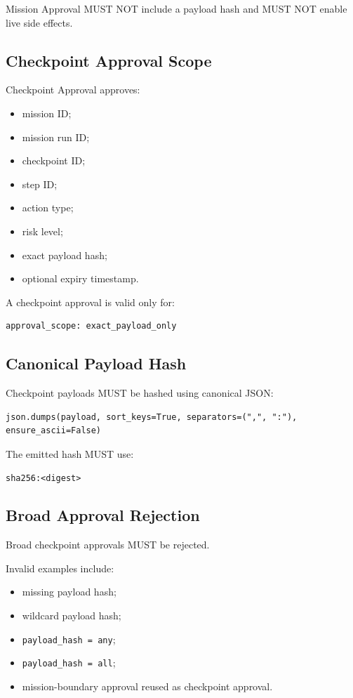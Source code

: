 Mission Approval MUST NOT include a payload hash and MUST NOT enable live side effects.

\subsection{Checkpoint Approval Scope}

Checkpoint Approval approves:

\begin{itemize}
  \item mission ID;
  \item mission run ID;
  \item checkpoint ID;
  \item step ID;
  \item action type;
  \item risk level;
  \item exact payload hash;
  \item optional expiry timestamp.
\end{itemize}

A checkpoint approval is valid only for:

\begin{verbatim}
approval_scope: exact_payload_only
\end{verbatim}

\subsection{Canonical Payload Hash}

Checkpoint payloads MUST be hashed using canonical JSON:

\begin{verbatim}
json.dumps(payload, sort_keys=True, separators=(",", ":"), ensure_ascii=False)
\end{verbatim}

The emitted hash MUST use:

\begin{verbatim}
sha256:<digest>
\end{verbatim}

\subsection{Broad Approval Rejection}

Broad checkpoint approvals MUST be rejected.

Invalid examples include:

\begin{itemize}
  \item missing payload hash;
  \item wildcard payload hash;
  \item \texttt{payload\_hash = any};
  \item \texttt{payload\_hash = all};
  \item mission-boundary approval reused as checkpoint approval.
\end{itemize}

